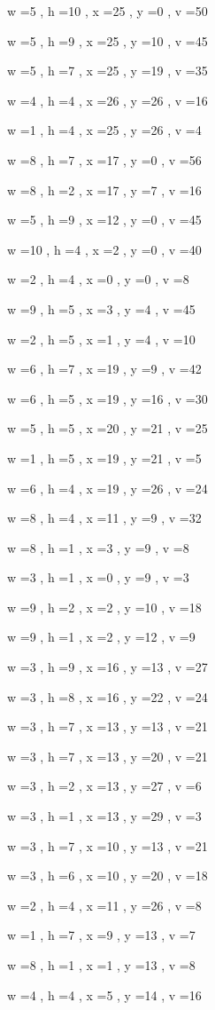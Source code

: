 \documentclass[11pt]{article}
\begin{document}
w =5 , h =10 , x =25 , y =0 , v =50
\par
w =5 , h =9 , x =25 , y =10 , v =45
\par
w =5 , h =7 , x =25 , y =19 , v =35
\par
w =4 , h =4 , x =26 , y =26 , v =16
\par
w =1 , h =4 , x =25 , y =26 , v =4
\par
w =8 , h =7 , x =17 , y =0 , v =56
\par
w =8 , h =2 , x =17 , y =7 , v =16
\par
w =5 , h =9 , x =12 , y =0 , v =45
\par
w =10 , h =4 , x =2 , y =0 , v =40
\par
w =2 , h =4 , x =0 , y =0 , v =8
\par
w =9 , h =5 , x =3 , y =4 , v =45
\par
w =2 , h =5 , x =1 , y =4 , v =10
\par
w =6 , h =7 , x =19 , y =9 , v =42
\par
w =6 , h =5 , x =19 , y =16 , v =30
\par
w =5 , h =5 , x =20 , y =21 , v =25
\par
w =1 , h =5 , x =19 , y =21 , v =5
\par
w =6 , h =4 , x =19 , y =26 , v =24
\par
w =8 , h =4 , x =11 , y =9 , v =32
\par
w =8 , h =1 , x =3 , y =9 , v =8
\par
w =3 , h =1 , x =0 , y =9 , v =3
\par
w =9 , h =2 , x =2 , y =10 , v =18
\par
w =9 , h =1 , x =2 , y =12 , v =9
\par
w =3 , h =9 , x =16 , y =13 , v =27
\par
w =3 , h =8 , x =16 , y =22 , v =24
\par
w =3 , h =7 , x =13 , y =13 , v =21
\par
w =3 , h =7 , x =13 , y =20 , v =21
\par
w =3 , h =2 , x =13 , y =27 , v =6
\par
w =3 , h =1 , x =13 , y =29 , v =3
\par
w =3 , h =7 , x =10 , y =13 , v =21
\par
w =3 , h =6 , x =10 , y =20 , v =18
\par
w =2 , h =4 , x =11 , y =26 , v =8
\par
w =1 , h =7 , x =9 , y =13 , v =7
\par
w =8 , h =1 , x =1 , y =13 , v =8
\par
w =4 , h =4 , x =5 , y =14 , v =16
\par
\newpage
\end{document}
